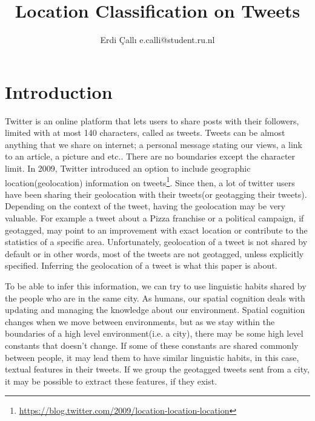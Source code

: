 \documentclass[twoside,11pt]{article}
\begin{document}
\title{Location Classification on Tweets}
\author{\name Erdi \c{C}all{\i}  \email e.calli@student.ru.nl}
\maketitle
\begin{abstract}

\end{abstract}


\section{Introduction}

Twitter is an online platform that lets users to share posts with their followers, limited with at most 140 characters, called as tweets. Tweets can be almost anything that we share on internet; a personal message stating our views, a link to an article, a picture and etc.. There are no boundaries except the character limit. In 2009, Twitter introduced an option to include geographic location(geolocation) information on tweets\footnote{\url{https://blog.twitter.com/2009/location-location-location}}. Since then, a lot of twitter users have been sharing their geolocation with their tweets(or geotagging their tweets). Depending on the context of the tweet, having the geolocation may be very valuable. For example a tweet about a Pizza franchise or a political campaign, if geotagged, may point to an improvement with exact location or contribute to the statistics of a specific area. Unfortunately, geolocation of a tweet is not shared by default or in other words, most of the tweets are not geotagged, unless explicitly specified. Inferring the geolocation of a tweet is what this paper is about.

To be able to infer this information, we can try to use linguistic habits shared by the people who are in the same city. As humans, our spatial cognition deals with updating and managing the knowledge about our environment. Spatial cognition changes when we move between environments, but as we stay within the boundaries of a high level environment(i.e. a city), there may be some high level constants that doesn't change. If some of these constants are shared commonly between people, it may lead them to have similar linguistic habits, in this case, textual features in their tweets. If we group the geotagged tweets sent from a city, it may be possible to extract these features, if they exist.
\end{document}

